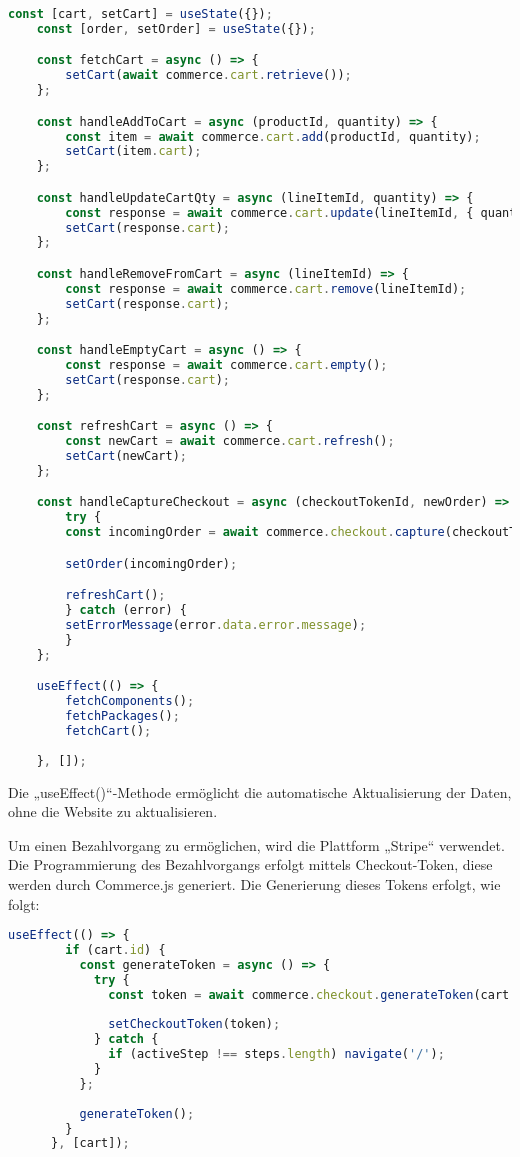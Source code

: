 \begin{lstlisting}[language=JavaScript]
    const [cart, setCart] = useState({});
    const [order, setOrder] = useState({});

    const fetchCart = async () => {
        setCart(await commerce.cart.retrieve());
    };

    const handleAddToCart = async (productId, quantity) => {
        const item = await commerce.cart.add(productId, quantity);
        setCart(item.cart);
    };

    const handleUpdateCartQty = async (lineItemId, quantity) => {
        const response = await commerce.cart.update(lineItemId, { quantity });
        setCart(response.cart);
    };

    const handleRemoveFromCart = async (lineItemId) => {
        const response = await commerce.cart.remove(lineItemId);
        setCart(response.cart);
    };

    const handleEmptyCart = async () => {
        const response = await commerce.cart.empty();
        setCart(response.cart);
    };

    const refreshCart = async () => {
        const newCart = await commerce.cart.refresh();
        setCart(newCart);
    };

    const handleCaptureCheckout = async (checkoutTokenId, newOrder) => {
        try {
        const incomingOrder = await commerce.checkout.capture(checkoutTokenId, newOrder);

        setOrder(incomingOrder);

        refreshCart();
        } catch (error) {
        setErrorMessage(error.data.error.message);
        }
    };

    useEffect(() => {
        fetchComponents();
        fetchPackages();
        fetchCart();
        
    }, []);
\end{lstlisting}

Die „useEffect()“-Methode ermöglicht die automatische Aktualisierung der Daten, ohne die Website zu aktualisieren.

Um einen Bezahlvorgang zu ermöglichen, wird die Plattform „Stripe“ verwendet. Die Programmierung des Bezahlvorgangs erfolgt mittels Checkout-Token, diese werden durch Commerce.js generiert. Die Generierung dieses Tokens erfolgt, wie folgt:

\begin{lstlisting}[language=JavaScript]
    useEffect(() => {
        if (cart.id) {
          const generateToken = async () => {
            try {
              const token = await commerce.checkout.generateToken(cart.id, { type: 'cart' });
    
              setCheckoutToken(token);
            } catch {
              if (activeStep !== steps.length) navigate('/');
            }
          };
    
          generateToken();
        }
      }, [cart]);
\end{lstlisting}

